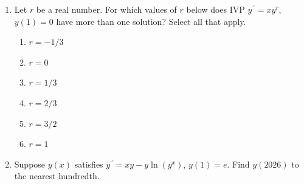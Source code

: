 \documentclass{ximera}
\begin{document}
\begin{enumerate}[label=(\arabic*)]


\begin{enumerate}[label=(\alph*)]
\item $y=0$ %
\item $y=t$
\item $y=t^2$
\item $y=t^3$
\item $y=t^4$
\item $y=t^5$ %
\item $y=-t$
\item $y=-t^2$
\item $y=-t^3$
\item $y=-t^4$
\item $y=-t^5$ 
\end{enumerate}



\newpage


\item Let $r$ be a real number.  For which values of $r$ below does IVP $y^{\,\prime}=xy^r$, $y(1)=0$ have more than one solution?  Select all that apply.

\begin{enumerate}[label=(\alph*)]
\item $r=-1/3$
\item $r=0$
\item $r=1/3$ %
\item $r=2/3$ %
\item $r=3/2$
\item $r=1$
\end{enumerate}


\item Suppose $y(x)$ satisfies $\displaystyle y^{\,\prime}=xy-y\ln{\left(y^x\right)}$, $y(1)=e$.  Find $y(2026)$ to the nearest hundredth.




\end{enumerate}
\end{document}
